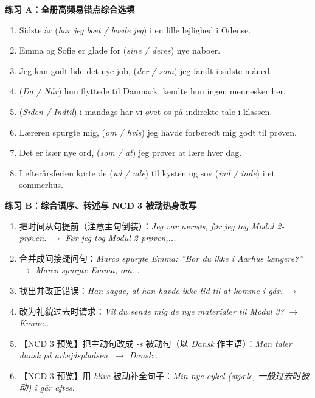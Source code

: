 \textbf{练习 A：全册高频易错点综合选填}
\begin{enumerate}
  \item Sidste år \underline{\hspace{2.2cm}} (\textit{har jeg boet / boede jeg}) i en lille lejlighed i Odense.
  \item Emma og Sofie er glade for \underline{\hspace{1.8cm}} (\textit{sine / deres}) nye naboer.
  \item Jeg kan godt lide det nye job, \underline{\hspace{1.8cm}} (\textit{der / som}) jeg fandt i sidste måned.
  \item \underline{\hspace{1.8cm}} (\textit{Da / Når}) hun flyttede til Danmark, kendte hun ingen mennesker her.
  \item \underline{\hspace{1.8cm}} (\textit{Siden / Indtil}) i mandags har vi øvet os på indirekte tale i klassen.
  \item Læreren spurgte mig, \underline{\hspace{1.8cm}} (\textit{om / hvis}) jeg havde forberedt mig godt til prøven.
  \item Det er især nye ord, \underline{\hspace{1.8cm}} (\textit{som / at}) jeg prøver at lære hver dag.
  \item I efterårsferien kørte de \underline{\hspace{2.0cm}} (\textit{ud / ude}) til kysten og sov \underline{\hspace{2.0cm}} (\textit{ind / inde}) i et sommerhus.
\end{enumerate}

\textbf{练习 B：综合语序、转述与 NCD 3 被动热身改写}
\begin{enumerate}
  \item 把时间从句提前（注意主句倒装）：\textit{Jeg var nervøs, før jeg tog Modul 2-prøven.} $\rightarrow$ \textit{Før jeg tog Modul 2-prøven,...}
  \item 合并成间接疑问句：\textit{Marco spurgte Emma: ”Bor du ikke i Aarhus længere?”} $\rightarrow$ \textit{Marco spurgte Emma, om...}
  \item 找出并改正错误：\textit{Han sagde, at han havde ikke tid til at komme i går.} $\rightarrow$
  \item 改为礼貌过去时请求：\textit{Vil du sende mig de nye materialer til Modul 3?} $\rightarrow$ \textit{Kunne...}
  \item 【NCD 3 预览】把主动句改成 \textit{-s} 被动句（以 \textit{Dansk} 作主语）：\textit{Man taler dansk på arbejdspladsen.} $\rightarrow$ \textit{Dansk...}
  \item 【NCD 3 预览】用 \textit{blive} 被动补全句子：\textit{Min nye cykel \underline{\hspace{2.4cm}} (\textit{stjæle}, 一般过去时被动) i går aftes.}
\end{enumerate}

